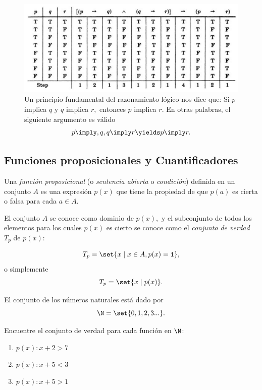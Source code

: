 	\begin{figure}
		\centering
		\includegraphics[width=0.7\linewidth]{md/tabla_silogismo}
		\caption{
			  Un principio fundamental del razonamiento lógico nos dice que:
				Si $p$ implica $q$ y $q$ implica $r,$ entonces $p$ implica $r.$ 
			En otras palabras, el siguiente argumento es válido
			$$
			p\imply,q, q\imply r \yields p \imply r.
			$$ }
		\label{fig:tabla_silogismo}
	\end{figure}

\subsection{Funciones proposicionales y Cuantificadores}


 Una \emph{función proposicional} (o \emph{sentencia abierta} o \emph{condición}) definida en un conjunto $A$ es una expresión $p(x)$ que tiene la propiedad de que $p(a)$ es cierta o falsa para cada $a \in A.$



 El conjunto $A$ se conoce como dominio de $p(x),$ y el subconjunto de todos los elementos para los cuales $p(x)$ es cierto se conoce como el \emph{conjunto de verdad} $T_{p}$ de $p(x):$
 
 $$T_{p}=\set{x \mid x\in A, p(x)=\texttt{1}},$$ 
 o simplemente 
 $$
 T_{p}=\set{x \mid p(x)}.
 $$


\begin{defn}
	El conjunto de los números naturales está dado por
	\begin{equation} \N = \set{0,1,2,3...} .\end{equation}	
	
\end{defn}

 \begin{problema}
  \label{lip:exmp:4.7}
  Encuentre el conjunto de verdad para cada función en $\N$:
  \begin{enumerate}
   \item $p(x): x+2>7$ 
   \item $p(x): x+5<3$ 
   \item $p(x): x+5>1$ 
  \end{enumerate}

 \end{problema}



